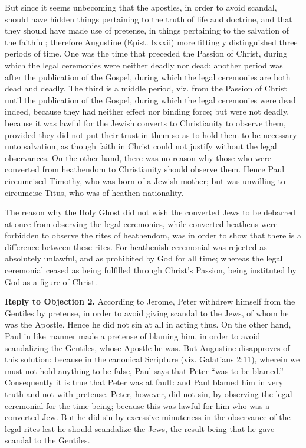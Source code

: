 But since it seems unbecoming that the apostles, in order to avoid scandal, should have hidden things pertaining to the truth of life and doctrine, and that they should have made use of pretense, in things pertaining to the salvation of the faithful; therefore Augustine (Epist. lxxxii) more fittingly distinguished three periods of time. One was the time that preceded the Passion of Christ, during which the legal ceremonies were neither deadly nor dead: another period was after the publication of the Gospel, during which the legal ceremonies are both dead and deadly. The third is a middle period, viz. from the Passion of Christ until the publication of the Gospel, during which the legal ceremonies were dead indeed, because they had neither effect nor binding force; but were not deadly, because it was lawful for the Jewish converts to Christianity to observe them, provided they did not put their trust in them so as to hold them to be necessary unto salvation, as though faith in Christ could not justify without the legal observances. On the other hand, there was no reason why those who were converted from heathendom to Christianity should observe them. Hence Paul circumcised Timothy, who was born of a Jewish mother; but was unwilling to circumcise Titus, who was of heathen nationality.

The reason why the Holy Ghost did not wish the converted Jews to be debarred at once from observing the legal ceremonies, while converted heathens were forbidden to observe the rites of heathendom, was in order to show that there is a difference between these rites. For heathenish ceremonial was rejected as absolutely unlawful, and as prohibited by God for all time; whereas the legal ceremonial ceased as being fulfilled through Christ's Passion, being instituted by God as a figure of Christ.

\textbf{Reply to Objection 2.} According to Jerome, Peter withdrew himself from the Gentiles by pretense, in order to avoid giving scandal to the Jews, of whom he was the Apostle. Hence he did not sin at all in acting thus. On the other hand, Paul in like manner made a pretense of blaming him, in order to avoid scandalizing the Gentiles, whose Apostle he was. But Augustine disapproves of this solution: because in the canonical Scripture (viz. Galatians 2:11), wherein we must not hold anything to be false, Paul says that Peter ``was to be blamed.'' Consequently it is true that Peter was at fault: and Paul blamed him in very truth and not with pretense. Peter, however, did not sin, by observing the legal ceremonial for the time being; because this was lawful for him who was a converted Jew. But he did sin by excessive minuteness in the observance of the legal rites lest he should scandalize the Jews, the result being that he gave scandal to the Gentiles.

